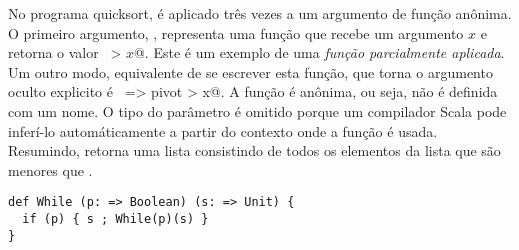 No programa quicksort,  é aplicado três vezes a um argumento 
de função anônima. O primeiro argumento, , representa uma 
função que recebe um argumento $x$ e retorna o valor ~\lstinline@pivot > $x$@.
Este é um exemplo de uma {\em função parcialmente aplicada}. Um outro modo, 
equivalente de se escrever esta função, que torna o argumento oculto explicito
é ~\lstinline@x => pivot > x@. A função é anônima, ou seja, não é definida
com um nome. O tipo do parâmetro   é omitido porque um compilador Scala 
pode inferí-lo automáticamente a partir do contexto onde a função é usada.
Resumindo,  retorna uma lista consistindo de todos os 
elementos da lista  que são menores que .  





\begin{lstlisting}
def While (p: => Boolean) (s: => Unit) {
  if (p) { s ; While(p)(s) }
}
\end{lstlisting}


